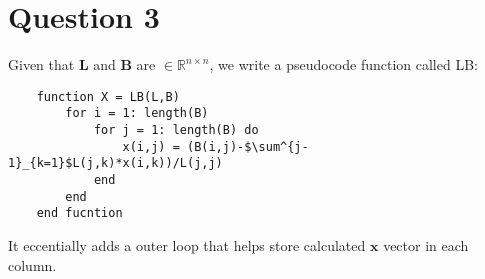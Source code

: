 \documentclass{article}
\newcommand{\mat}[1]{\mathbf{#1}}
\begin{document}
\section*{Question 3}
    
Given that $\mat{L}$ and $\mat{B}$ are $\in \mathbb{R}^{n \times n}$, we write
a pseudocode function called LB:
\begin{lstlisting}
    function X = LB(L,B)
        for i = 1: length(B)
            for j = 1: length(B) do
                x(i,j) = (B(i,j)-$\sum^{j-1}_{k=1}$L(j,k)*x(i,k))/L(j,j)
            end
        end
    end fucntion
\end{lstlisting}
It eccentially adds a outer loop that helps store calculated $\mat{x}$ vector in each column. 
\end{document}
